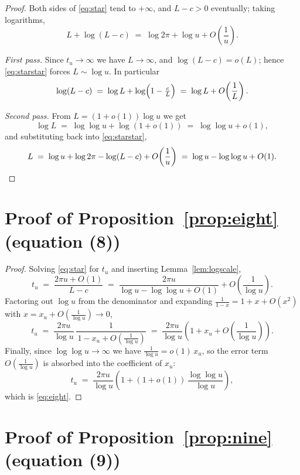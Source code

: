 \documentclass[11pt]{article}
\theoremstyle{remark}
\begin{document}
\begin{proof}
  Both sides of \eqref{eq:star} tend to $+\infty$, and $L - c > 0$
  eventually; taking logarithms,
  \begin{equation}
    L + \log(L - c) \;=\; \log 2\pi + \log u + O\!\left(\frac1u\right).
    \tag{$**$}\label{eq:starstar}
  \end{equation}

  \emph{First pass.} Since $t_u \to \infty$ we have $L \to \infty$, and
  $\log(L-c) = o(L)$; hence \eqref{eq:starstar} forces
  $L \sim \log u$. In particular
  \[
    \log(L - c) \;=\; \log L + \log\Bigl(1 - \tfrac{c}{L}\Bigr)
    \;=\; \log L + O\!\left(\frac1L\right).
  \]

  \emph{Second pass.} From $L = (1+o(1))\log u$ we get
  \[
    \log L \;=\; \log\log u + \log(1+o(1)) \;=\; \log\log u + o(1),
  \]
  and substituting back into \eqref{eq:starstar},
  \[
    L \;=\; \log u + \log 2\pi - \log(L - c) + O\!\left(\frac1u\right)
      \;=\; \log u - \log\log u + O(1). \qedhere
  \]
\end{proof}

\section{Proof of Proposition~\ref{prop:eight} (equation (8))}

\begin{proof}
  Solving \eqref{eq:star} for $t_u$ and inserting
  Lemma~\ref{lem:logscale},
  \[
    t_u \;=\; \frac{2\pi u + O(1)}{L - c}
        \;=\; \frac{2\pi u}{\log u - \log\log u + O(1)}
              + O\!\left(\frac{1}{\log u}\right).
  \]
  Factoring out $\log u$ from the denominator and expanding
  $\frac{1}{1-x} = 1 + x + O(x^2)$ with
  $x = x_u + O\!\left(\frac{1}{\log u}\right) \to 0$,
  \[
    t_u \;=\; \frac{2\pi u}{\log u}\,
        \frac{1}{\,1 - x_u + O\!\left(\frac{1}{\log u}\right)}
        \;=\; \frac{2\pi u}{\log u}
        \left(1 + x_u + O\!\left(\frac{1}{\log u}\right)\right).
  \]
  Finally, since $\log\log u \to \infty$ we have
  $\frac{1}{\log u} = o(1)\,x_u$, so the error term
  $O\!\left(\frac{1}{\log u}\right)$ is absorbed into the coefficient of
  $x_u$:
  \[
    t_u \;=\; \frac{2\pi u}{\log u}
        \left(1 + (1 + o(1))\,\frac{\log\log u}{\log u}\right),
  \]
  which is \eqref{eq:eight}.
\end{proof}

\section{Proof of Proposition~\ref{prop:nine} (equation (9))}
\end{document}
